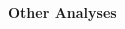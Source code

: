 \documentclass[portrait,a0b,final,a4resizeable]{include/a0poster}
\begin{document}
\begin{poster}
\begin{multicols}{2}
%
%
%

\end{multicols}


\vspace*{4cm}

\begin{center}
\begin{pcolumn}{1.03}

{}
{
  \begin{center}
    {\sffamily \VeryHuge \textbf{Other Analyses}}
  \end{center}
}
\end{pcolumn}
\end{center}




\begin{multicols}{2}




\end{multicols}
\end{poster}
\end{document}
